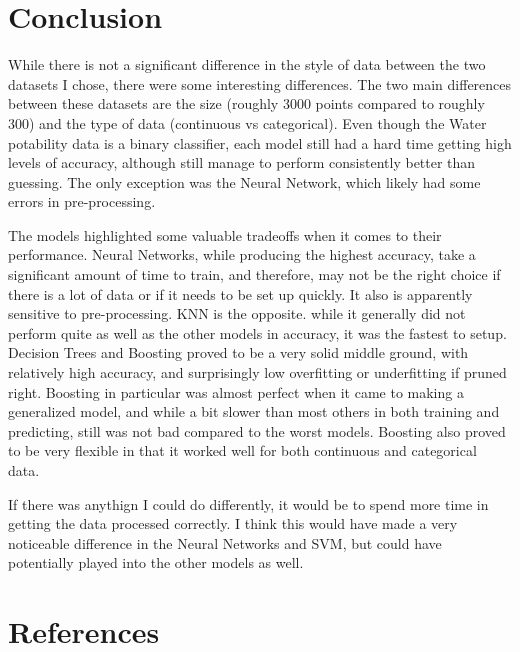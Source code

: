 \documentclass[
	letterpaper, %
]{mlreport}
\begin{document}
\section{Conclusion}
While there is not a significant difference in the style of data between the two datasets I chose, there were some interesting differences. The two main differences between these datasets are the size (roughly 3000 points compared to roughly 300) and the type of data (continuous vs categorical). Even though the Water potability data is a binary classifier, each model still had a hard time getting high levels of accuracy, although still manage to perform consistently better than guessing. The only exception was the Neural Network, which likely had some errors in pre-processing.

The models highlighted some valuable tradeoffs when it comes to their performance. Neural Networks, while producing the highest accuracy, take a significant amount of time to train, and therefore, may not be the right choice if there is a lot of data or if it needs to be set up quickly. It also is apparently sensitive to pre-processing. KNN is the opposite. while it generally did not perform quite as well as the other models in accuracy, it was the fastest to setup. Decision Trees and Boosting proved to be a very solid middle ground, with relatively high accuracy, and surprisingly low overfitting or underfitting if pruned right. Boosting in particular was almost perfect when it came to making a generalized model, and while a bit slower than most others in both training and predicting, still was not bad compared to the worst models. Boosting also proved to be very flexible in that it worked well for both continuous and categorical data.

If there was anythign I could do differently, it would be to spend more time in getting the data processed correctly. I think this would have made a very noticeable difference in the Neural Networks and SVM, but could have potentially played into the other models as well.

\newpage

\section{References}
\nocite{water}
\nocite{heart}
\nocite{Mitchell}
\printbibliography
\end{document}
